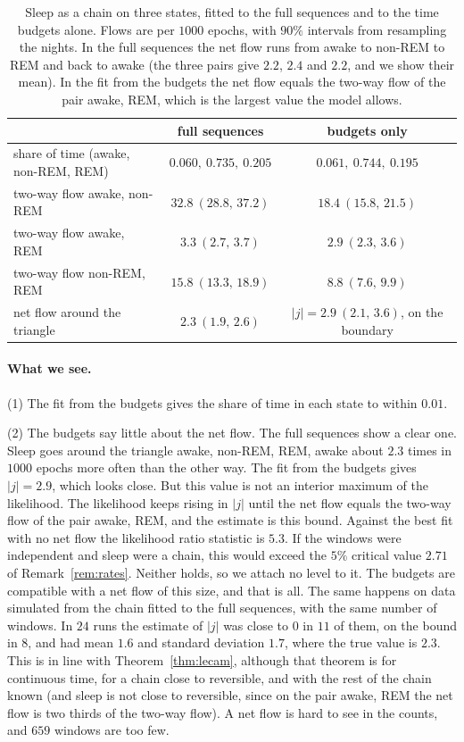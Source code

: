 \documentclass[11pt]{article}
\theoremstyle{definition}
\theoremstyle{remark}
\begin{document}
\begin{table}[ht]\centering\small
\begin{tabular}{lcc}
\toprule
 & full sequences & budgets only\\
\midrule
share of time (awake, non-REM, REM) & $0.060,\ 0.735,\ 0.205$ & $0.061,\ 0.744,\ 0.195$\\
two-way flow awake, non-REM & $32.8\ (28.8,\,37.2)$ & $18.4\ (15.8,\,21.5)$\\
two-way flow awake, REM & $3.3\ (2.7,\,3.7)$ & $2.9\ (2.3,\,3.6)$\\
two-way flow non-REM, REM & $15.8\ (13.3,\,18.9)$ & $8.8\ (7.6,\,9.9)$\\
net flow around the triangle & $2.3\ (1.9,\,2.6)$ & $\lvert j\rvert=2.9\ (2.1,\,3.6)$, on the boundary\\
\bottomrule
\end{tabular}
\caption{Sleep as a chain on three states, fitted to the full sequences and to
the time budgets alone. Flows are per $1000$ epochs, with $90\%$ intervals
from resampling the nights. In the full sequences the net flow runs from awake
to non-REM to REM and back to awake (the three pairs give $2.2$, $2.4$ and
$2.2$, and we show their mean). In the fit from the budgets the net flow
equals the two-way flow of the pair awake, REM, which is the largest value the
model allows.}
\label{tab:sleep}
\end{table}

\paragraph{What we see.} (1) The fit from the budgets gives the share of time
in each state to within $0.01$.

(2) The budgets say little about the net flow. The full sequences show a clear
one. Sleep goes around the triangle awake, non-REM, REM, awake about $2.3$ times
in $1000$ epochs more often than the other way. The fit from the budgets
gives $\lvert j\rvert=2.9$, which looks close. But this value is not an
interior maximum of the likelihood. The likelihood keeps rising in
$\lvert j\rvert$ until the net flow equals the two-way flow of the pair awake,
REM, and the estimate is this bound. Against the best fit with no net flow the
likelihood ratio statistic is $5.3$. If the windows were independent and sleep
were a chain, this would exceed the $5\%$ critical value $2.71$ of
Remark~\ref{rem:rates}. Neither holds, so we attach no level to it. The
budgets are compatible with a net flow of this size, and that is all. The same
happens on data simulated from the chain fitted to the full sequences, with
the same number of windows. In $24$ runs the estimate of $\lvert j\rvert$ was
close to $0$ in $11$ of them, on the bound in $8$, and had mean $1.6$ and standard
deviation $1.7$, where the true value is $2.3$. This is in line with
Theorem~\ref{thm:lecam}, although that theorem is for continuous time, for a
chain close to reversible, and with the rest of the chain known (and sleep is
not close to reversible, since on the pair awake, REM the net flow is two
thirds of the two-way flow). A net flow is
hard to see in the counts, and $659$ windows are too few.
\end{document}
